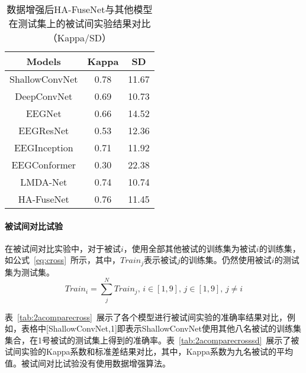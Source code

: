 \begin{table}[ht]
    \centering
    \caption{数据增强后HA-FuseNet与其他模型在测试集上的被试间实验结果对比（Kappa/SD）}
    \label{tab:2acompareagsd}
    \begin{tabularx}{\textwidth}{CCC}
      \toprule
      Models & Kappa & SD \\
      \midrule
      ShallowConvNet\cite{schirrmeister2017deep} & 0.78 & 11.67 \\
      DeepConvNet\cite{schirrmeister2017deep} & 0.69 & 10.73 \\
      EEGNet\cite{lawhern2018eegnet} & 0.66 & 14.52 \\
      EEGResNet\cite{HBM:HBM23730} & 0.53 & 12.36 \\
      EEGInception\cite{zhang2021eeg} & 0.71 & 11.92 \\
      EEGConformer\cite{song2022eeg} & 0.30 & 22.38 \\
      LMDA-Net\cite{miao2023lmda} & 0.74 & 10.74 \\
      \midrule 
      HA-FuseNet & 0.76 & 11.45 \\
      \bottomrule
    \end{tabularx}
\end{table}

\paragraph{被试间对比试验}

在被试间对比实验中，对于被试\(i\)，使用全部其他被试的训练集为被试\(i\)的训练集，如公式~\ref{eq:cross}~所示，其中，\(Train_j\)表示被试\(j\)的训练集。仍然使用被试\(i\)的测试集为测试集。
\begin{equation}
    \label{eq:cross}
    Train_i=\sum_{j}^{N}Train_j,\,i \in [1,9],\,j \in [1,9],\,j \neq i
\end{equation}

表~\ref{tab:2acomparecross}~展示了各个模型进行被试间实验的准确率结果对比，例如，表格中[ShallowConvNet,1]即表示ShallowConvNet使用其他八名被试的训练集集合，在1号被试的测试集上得到的准确率。表~\ref{tab:2acomparecrosssd}~展示了被试间实验的Kappa系数和标准差结果对比，其中，Kappa系数为九名被试的平均值。被试间对比试验没有使用数据增强算法。

